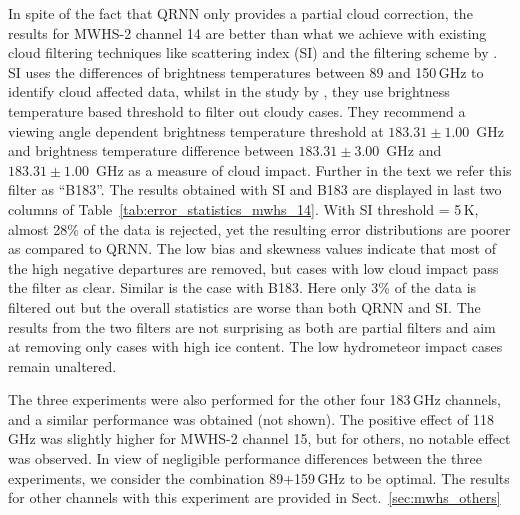 \documentclass[amt, manuscript]{copernicus}
\begin{document}
In spite of the fact that QRNN only provides a partial cloud correction, the results for  MWHS-2 channel 14 are better than what we achieve with existing cloud filtering techniques like scattering index (SI) and the filtering scheme by \citet{buehler:aclou:07}. SI uses the differences of brightness temperatures between 89 and 150\,GHz to identify cloud affected data, whilst in the study by \citet{buehler:aclou:07}, they use brightness temperature based threshold to filter out cloudy cases. They recommend a viewing angle dependent brightness temperature threshold at $183.31\pm1.00$ \,GHz and brightness temperature difference between $183.31\pm3.00$ \,GHz and $183.31\pm 1.00$ \,GHz as a measure of cloud impact. Further in the text we refer this filter as ``B183''. The results obtained with SI and B183 are displayed in last two columns of Table~\ref{tab:error_statistics_mwhs_14}. With SI threshold = 5\,K, almost 28\% of the data is rejected, yet the resulting error distributions are poorer as compared to QRNN. The low bias and skewness values indicate that most of the high negative departures are removed, but cases with low cloud impact pass the filter as clear. Similar is the case with B183. Here only 3\% of the data is filtered out but the overall statistics are worse than both QRNN and SI. The results from the two filters are not surprising as both are partial filters and aim at removing only cases with high ice content. The low hydrometeor impact cases remain unaltered.

The three experiments were also performed for the other four 183\,GHz channels, and a similar performance was obtained (not shown). The positive effect of 118\,GHz was slightly higher for MWHS-2 channel 15, but for others, no notable effect was observed. In view of negligible performance differences between the three experiments, we consider the combination 89+159\,GHz to be optimal. The results for other channels with this experiment are provided in Sect.~\ref{sec:mwhs_others} 
\end{document}

